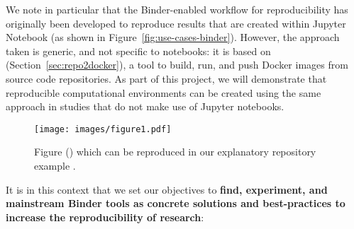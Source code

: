 We note in particular that the Binder-enabled workflow for reproducibility has
originally been developed to reproduce results that are created within Jupyter
Notebook (as shown in Figure~\ref{fig:use-cases-binder}).
However, the approach taken is generic, and not specific to notebooks: it is
based on \repotodocker (Section~\ref{sec:repo2docker}), a tool to build, run, and 
push Docker images from source code repositories.
As part of this project, we will demonstrate that reproducible
computational environments can be created  using the same approach
in studies that do not make use of Jupyter notebooks.

\begin{figure}
  \centering
  \texttt{[image: images/figure1.pdf]}
  \caption{Figure () which can be reproduced in our explanatory repository example
    \cite{ReproducibilityRepositoryExample2022}. \label{fig:reproducibility-example-covid}}
\end{figure}



It is in this context that we set our objectives to \textbf{find, experiment, and mainstream Binder tools as concrete solutions and best-practices to increase the reproducibility of research}:



